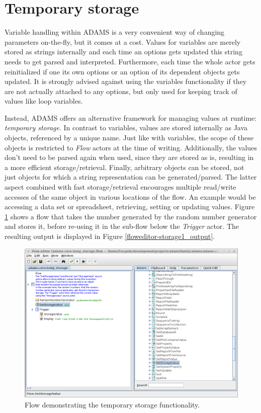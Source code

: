 \section{Temporary storage}
\label{temporary_storage}
Variable handling within ADAMS is a very convenient way of changing parameters
on-the-fly, but it comes at a cost. Values for variables are merely stored as
strings internally and each time an options gets updated this string needs to
get parsed and interpreted. Furthermore, each time the whole actor gets
reinitialized if one its own options or an option of its dependent objects gets
updated. It is strongly advised against using the variables functionality if
they are not actually attached to any options, but only used for keeping track
of values like loop variables.

Instead, ADAMS offers an alternative framework for managing values at runtime:
\textit{temporary storage}. In contrast to variables, values are stored
internally as Java objects, referenced by a unique name. Just like with
variables, the scope of these objects is restricted to \textit{Flow} actors at
the time of writing. Additionally, the values don't need to be parsed again
when used, since they are stored as is, resulting in a more efficient
storage/retrieval. Finally, arbitrary objects can be stored, not just objects
for which a string representation can be generated/parsed. The latter aspect
combined with fast storage/retrieval encourages multiple read/write accesses of
the same object in various locations of the flow. An example would be accessing
a data set or spreadsheet, retrieving, setting or updating values. Figure
\ref{floweditor-storage1_flow} shows a flow that takes the number generated by
the random number generator and stores it, before re-using it in the sub-flow
below the \textit{Trigger} actor. The resulting output is displayed in Figure
\ref{floweditor-storage1_output}.

\begin{figure}[htb]
  \centering
  \includegraphics[width=12.0cm]{images/floweditor-storage1_flow.png}
  \caption{Flow demonstrating the temporary storage functionality.}
  \label{floweditor-storage1_flow}
\end{figure}

